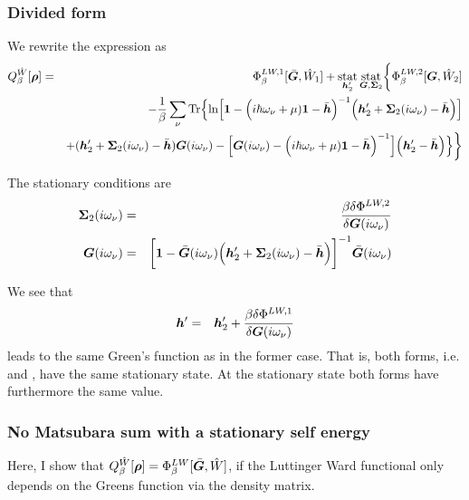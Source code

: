 \documentclass[11pt,a4paper]{report}
\begin{document}
\subsubsection{Divided form}
We rewrite the expression as
\begin{eqnarray}
Q^{\hat{W}}_\beta[\bm{\rho}]
&=&
\Phi^{LW,1}_\beta[\bar{\bm{G}},\hat{W}_1]+
\operatorname*{stat}_{\bm{h}'_2}\operatorname*{stat}_{\bm{G},\bm{\Sigma}_2}
\biggl\lbrace
\Phi^{LW,2}_\beta[\bm{G},\hat{W}_2]
\nonumber\\
&&-\frac{1}{\beta}\sum_\nu\mathrm{Tr}\Bigl\lbrace
\ln\Bigl[
\bm{1}-
\Bigl(i\hbar\omega_\nu+\mu)\bm{1}-\bar{\bm{h}}\Bigr)^{-1}
\Bigl(\bm{h}'_2+\bm{\Sigma}_2(i\omega_\nu)-\bar{\bm{h}}\Bigr)
\Bigr]
\nonumber\\&&
+(\bm{h}'_2+\bm{\Sigma}_2(i\omega_\nu)-\bar{\bm{h}})\bm{G}(i\omega_\nu)
-
\Bigl[
\bm{G}(i\omega_\nu)
-\Bigl(i\hbar\omega_\nu+\mu)\bm{1}-\bar{\bm{h}}\Bigr)^{-1}
\Bigr]
\Bigl(\bm{h}'_2-\bar{\bm{h}}\Bigr)\Bigr\rbrace
\biggr\rbrace
\nonumber\\
\label{eq:dmfQgreenafterdivision}
\end{eqnarray}

The stationary conditions are
\begin{eqnarray}
\bm{\Sigma}_2(i\omega_\nu)
&=&\frac{\beta\delta\Phi^{LW,2}}{\delta\bm{G}(i\omega_\nu)}
\nonumber\\
\bm{G}(i\omega_\nu)&=&\biggl[\bm{1}-\bar{\bm{G}}(i\omega_\nu)
\Bigl(\bm{h}'_2
+\bm{\Sigma}_2(i\omega_\nu)-\bar{\bm{h}}\Bigr)\biggr]^{-1}
\bar{\bm{G}}(i\omega_\nu)
\end{eqnarray}

We see that 
\begin{eqnarray}
\bm{h}'&=&
\bm{h}'_2+
\frac{\beta\delta\Phi^{LW,1}}{\delta\bm{G}(i\omega_\nu)}
\end{eqnarray}
leads to the same Green's function as in the former case. That is,
both forms, i.e.  and
, have the same stationary state.  At
the stationary state both forms have furthermore the same value.

\subsubsection{No Matsubara sum with a stationary self energy}
Here, I show that
$Q^{\hat{W}}_\beta[\bm{\rho}]=\Phi^{LW}_\beta[\bar{\bm{G}},\hat{W}]$,
if the Luttinger Ward functional only depends on the Greens function
via the density matrix.
\end{document}
